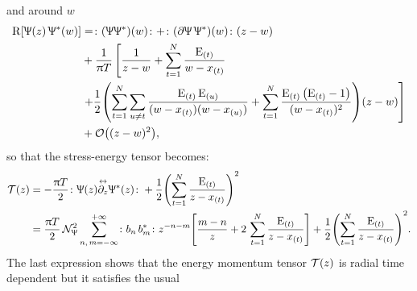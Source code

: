 and around $w$
\begin{equation}
  \begin{split}
    \rR\qty[\Psi( z )\, \Psi^*( w )]
    & =
    \no{ \qty(\Psi \Psi^*)( w ) }
    +
    \no{ \qty(\pd \Psi\, \Psi^*)( w ) } (z-w)
    \\
    & +
    \frac{1}{\pi T}
    \left[%
      \frac{1}{z- w}
      +
      \finitesum{t}{1}{N} \frac{\rE_{(t)}}{w - x_{(t)}}
    \right.
    \\
    & \left.
      + \frac{1}{2}
      \qty(%
        \finitesum{t}{1}{N}
        \sum\limits_{u \neq t}
        \frac{\rE_{(t)}\, \rE_{(u)}}{(w - x_{(t)}) (w - x_{(u)})}
        +
        \finitesum{t}{1}{N}
        \frac{\rE_{(t)}\, \qty( \rE_{(t)} - 1 )}{( w - x_{(t)} )^2}
      )
      \qty( z - w )
    \right]
    \\
    & +
    \order{( z - w )^2},
  \end{split}
\end{equation}      
so that the stress-energy tensor becomes:
\begin{equation}
  \begin{split}
    \cT( z )
    & =
    -\frac{\pi T}{2}
    \no{ \Psi( z ) \lripd{z} \Psi^*( z ) } 
    +
    \frac{1}{2}
    \qty( \finitesum{t}{1}{N}  \frac{\rE_{(t)}}{z - x_{(t)}} )^2
    \\
    & =
    \frac{\pi T }{2}\, \cN_{\Psi}^2
    \infinfsum{n,\, m}
    \no{b_n\, b^*_m}
    z^{-n-m}
    \qty[%
      \frac{m-n}{z}
      +
      2\, \finitesum{t}{1}{N} \frac{\rE_{(t)}}{z-x_{(t)}}
    ]
    +
    \frac{1}{2} \qty( \finitesum{t}{1}{N} \frac{\rE_{(t)}}{z - x_{(t)}} )^2.
  \end{split}
\end{equation}
The last expression shows that the energy momentum tensor $\mathcal{T}( z )$ is radial time dependent but it satisfies the usual \ope

